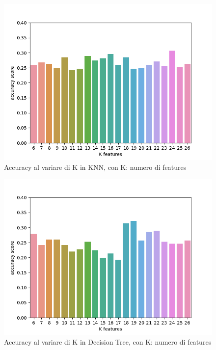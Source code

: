 \begin{figure}[H]
    \centering
    \includegraphics[width=0.5\columnwidth]{figures/KBEST_KNN.png}
    \caption{Accuracy al variare di K in KNN, con K: numero di features}
    \label{fig:features_selectionKNN}
\end{figure}

\begin{figure}[H]
    \centering
    \includegraphics[width=0.5\columnwidth]{figures/KBestDT.png}
    \caption{Accuracy al variare di K in Decision Tree, con K: numero di features}
    \label{fig:features_selection_DT}
\end{figure}



